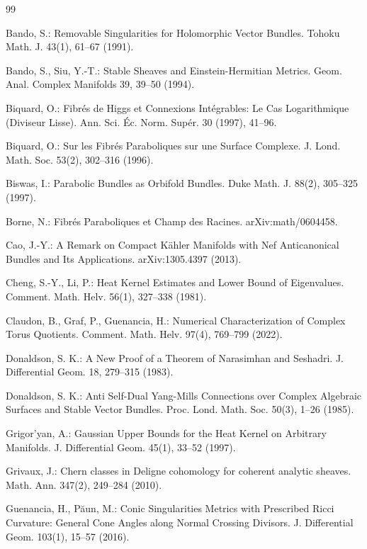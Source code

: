\documentclass[12pt,a4paper]{article}
\begin{document}
\begin{thebibliography}{99}

Bando, S.: Removable Singularities for Holomorphic Vector Bundles. Tohoku Math. J. 43(1), 61--67 (1991).

Bando, S., Siu, Y.-T.: Stable Sheaves and Einstein-Hermitian Metrics. Geom. Anal. Complex Manifolds 39, 39--50 (1994).

Biquard, O.: Fibr\'es de Higgs et Connexions Int\'egrables: Le Cas Logarithmique (Diviseur Lisse). Ann. Sci. \'Ec. Norm. Sup\'er. 30 (1997), 41--96.

Biquard, O.: Sur les Fibr\'es Paraboliques sur une Surface Complexe. J. Lond. Math. Soc. 53(2), 302--316 (1996).

Biswas, I.: Parabolic Bundles as Orbifold Bundles. Duke Math. J. 88(2), 305--325 (1997).

Borne, N.: Fibr\'es Paraboliques et Champ des Racines. arXiv:math/0604458.

Cao, J.-Y.: A Remark on Compact K\"ahler Manifolds with Nef Anticanonical Bundles and Its Applications. arXiv:1305.4397 (2013).

Cheng, S.-Y., Li, P.: Heat Kernel Estimates and Lower Bound of Eigenvalues. Comment. Math. Helv. 56(1), 327--338 (1981).

Claudon, B., Graf, P., Guenancia, H.: Numerical Characterization of Complex Torus Quotients. Comment. Math. Helv. 97(4), 769--799 (2022).

Donaldson, S. K.: A New Proof of a Theorem of Narasimhan and Seshadri. J. Differential Geom. 18, 279--315 (1983).

Donaldson, S. K.: Anti Self-Dual Yang-Mills Connections over Complex Algebraic Surfaces and Stable Vector Bundles. Proc. Lond. Math. Soc. 50(3), 1--26 (1985).

Grigor'yan, A.: Gaussian Upper Bounds for the Heat Kernel on Arbitrary Manifolds. J. Differential Geom. 45(1), 33--52 (1997).

Grivaux, J.: Chern classes in Deligne cohomology for coherent analytic sheaves. Math. Ann. 347(2), 249--284 (2010).

Guenancia, H., P\u{a}un, M.: Conic Singularities Metrics with Prescribed Ricci Curvature: General Cone Angles along Normal Crossing Divisors. J. Differential Geom. 103(1), 15--57 (2016).


\end{thebibliography}
\end{document}
